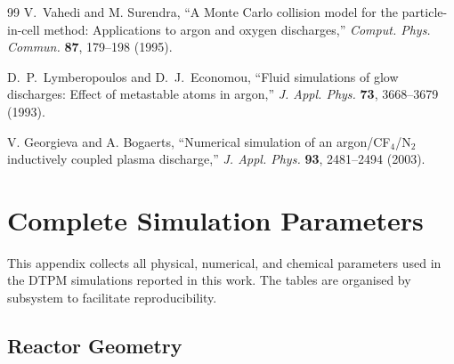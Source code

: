 \documentclass[11pt,a4paper]{report}
\begin{document}
\begin{thebibliography}{99}
V.~Vahedi and M. Surendra,
``A Monte Carlo collision model for the particle-in-cell method: Applications to argon and oxygen discharges,''
\emph{Comput. Phys. Commun.} \textbf{87}, 179--198 (1995).

D.~P.~Lymberopoulos and D.~J.~Economou,
``Fluid simulations of glow discharges: Effect of metastable atoms in argon,''
\emph{J. Appl. Phys.} \textbf{73}, 3668--3679 (1993).

V. Georgieva and A. Bogaerts,
``Numerical simulation of an argon/CF$_4$/N$_2$ inductively coupled plasma discharge,''
\emph{J. Appl. Phys.} \textbf{93}, 2481--2494 (2003).

\end{thebibliography}


\appendix

\chapter{Complete Simulation Parameters}
\label{app:parameters}

This appendix collects all physical, numerical, and chemical parameters used in the DTPM simulations reported in this work.  The tables are organised by subsystem to facilitate reproducibility.

\section{Reactor Geometry}
\label{app:geometry}
\end{document}
